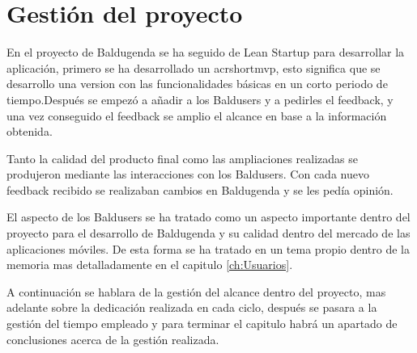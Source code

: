 \chapter{Gestión del proyecto}
\label{ch:Gestion del proyecto}
En el proyecto de Baldugenda se ha seguido de Lean Startup \cite{LeanStartup} para desarrollar la aplicación, primero se ha desarrollado un acrshort{mvp}, esto significa que se desarrollo una version con las funcionalidades básicas en un corto periodo de tiempo.Después se empezó a añadir a los Baldusers y a pedirles el feedback, y una vez conseguido el feedback se amplio el alcance en base a la información obtenida.

Tanto la calidad del producto final como las ampliaciones realizadas se produjeron mediante las interacciones con los Baldusers. Con cada nuevo feedback recibido se realizaban cambios en Baldugenda y se les pedía opinión.

El aspecto de los Baldusers se ha tratado como un aspecto importante dentro del proyecto para el desarrollo de Baldugenda y su calidad dentro del mercado de las aplicaciones móviles. De esta forma se ha tratado en un tema propio dentro de la memoria mas detalladamente en el capitulo \ref{ch:Usuarios}.

A continuación se hablara de la gestión del alcance dentro del proyecto, mas adelante sobre la dedicación realizada en cada ciclo, después se pasara a la gestión del tiempo empleado y para terminar el capitulo habrá un apartado de conclusiones acerca de la gestión realizada.
\newpage

\newpage

\newpage

\newpage
































